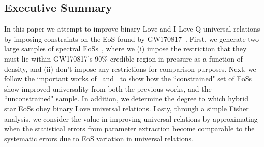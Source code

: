 \documentclass[prd,twocolumn,nofootinbib,superscriptaddress,amsmath,amssymb]{revtex4-1}
\begin{document}
\subsection{Executive Summary}
In this paper we attempt to improve binary Love and I-Love-Q universal relations by imposing constraints on the EoS found by GW170817~\cite{LIGO:posterior,TheLIGOScientific:2017qsa}.
First, we generate two large samples of spectral EoSs~\cite{Lindblom:2018rfr}, where we (i) impose the restriction that they must lie within GW170817's 90\% credible region in pressure as a function of density, and (ii) don't impose any restrictions for comparison purposes.
Next, we follow the important works of~\cite{Yagi:binLove} and~\cite{Yagi:ILQ} to show how the ``constrained" set of EoSs show improved universality from both the previous works, and the ``unconstrained" sample.
In addition, we determine the degree to which hybrid star EoSs obey binary Love universal relations.
Lasty, through a simple Fisher analysis, we consider the value in improving universal relations by approximating when the statistical errors from parameter extraction become comparable to the systematic errors due to EoS variation in universal relations.
\end{document}
